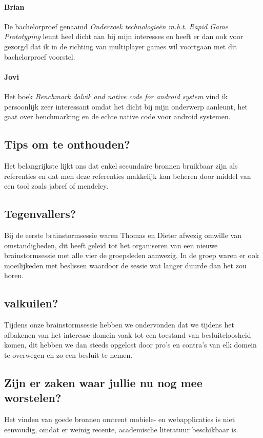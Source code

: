 \documentclass[fleqn,10pt]{voorstel}
\begin{document}

\paragraph{Brian}De bachelorproef genaamd \textit{Onderzoek technologieën m.b.t. Rapid Game Prototyping} \citep{Timmerman2013} leunt heel dicht aan bij mijn interesses en heeft er dan ook voor gezorgd dat ik in de richting van multiplayer games wil voortgaan met dit bachelorproef voorstel.

\paragraph{Jovi} Het boek \textit{Benchmark dalvik and native code for android system} \citep{Lin2011} vind ik persoonlijk zeer interessant omdat het dicht bij mijn onderwerp aanleunt, het gaat over benchmarking en de echte native code voor android systemen.

\subsection{Tips om te onthouden?}
Het belangrijkste lijkt ons dat enkel secundaire bronnen bruikbaar zijn als referenties en dat men deze referenties makkelijk kan beheren door middel van een tool zoals jabref of mendeley.

\subsection{Tegenvallers?}
Bij de eerste brainstormsessie waren Thomas en Dieter afwezig omwille van omstandigheden, dit heeft geleid tot het organiseren van een nieuwe brainstormsessie met alle vier de groepsleden aanwezig. In de groep waren er ook
moeilijkeden met beslissen waardoor de sessie wat langer duurde dan het zou horen.

\subsection{valkuilen?}
Tijdens onze brainstormsessie hebben we ondervonden dat we tijdens het afbakenen van het interesse domein vaak tot een toestand van besluiteloosheid komen, dit hebben we dan steeds opgelost door pro's en contra's van elk domein te overwegen en zo een besluit te nemen. 

\subsection{Zijn er zaken waar jullie nu nog mee worstelen?}
Het vinden van goede bronnen omtrent mobiele- en webapplicaties is niet eenvoudig, omdat er weinig recente, academische literatuur beschikbaar is. 
\end{document}

